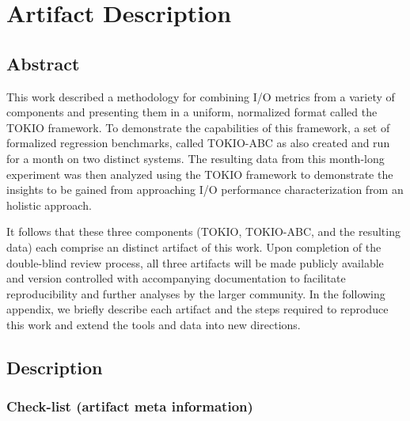 \appendix

\section{Artifact Description} \label{sec:appendix/artifacts}


\subsection{Abstract}

This work described a methodology for combining I/O metrics from a variety of components and presenting them in a uniform, normalized format called the TOKIO framework.
To demonstrate the capabilities of this framework, a set of formalized regression benchmarks, called TOKIO-ABC as also created and run for a month on two distinct systems.
The resulting data from this month-long experiment was then analyzed using the TOKIO framework to demonstrate the insights to be gained from approaching I/O performance characterization from an holistic approach.

It follows that these three components (TOKIO, TOKIO-ABC, and the resulting data) each comprise an distinct artifact of this work.  Upon completion of the double-blind review process, all three artifacts will be made publicly available and version controlled with accompanying documentation to facilitate reproducibility and further analyses by the larger community.  In the following appendix, we briefly describe each artifact and the steps required to reproduce this work and extend the tools and data into new directions.

\subsection{Description}

\subsubsection{Check-list (artifact meta information)}

